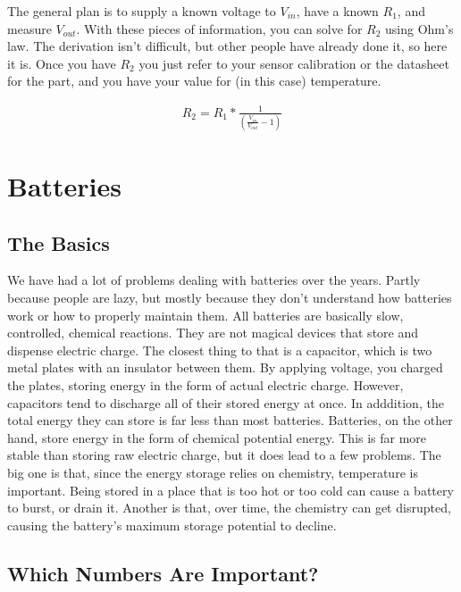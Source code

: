 The general plan is to supply a known voltage to $V_{in}$, have a known $R_1$, and measure $V_{out}$. With these pieces of information, you can solve for $R_2$ using Ohm's law. The derivation isn't difficult, but other people have already done it, so here it is. Once you have $R_2$ you just refer to your sensor calibration or the datasheet for the part, and you have your value for (in this case) temperature.

\begin{equation} \label{eqn:solveforr}
\begin{split}
R_2 = R_1*\frac{1}{(\frac{V_{in}}{V_{out}}-1)}
\end{split}
\end{equation}

\section{Batteries}
\label{sec:batteries}

\subsection{The Basics}

We have had a lot of problems dealing with batteries over the years. Partly because people are lazy, but mostly because they don't understand how batteries work or how to properly maintain them. All batteries are basically slow, controlled, chemical reactions. They are not magical devices that store and dispense electric charge. The closest thing to that is a capacitor, which is two metal plates with an insulator between them. By applying voltage, you charged the plates, storing energy in the form of actual electric charge. However, capacitors tend to discharge all of their stored energy at once. In adddition, the total energy they can store is far less than most batteries. Batteries, on the other hand, store energy in the form of chemical potential energy. This is far more stable than storing raw electric charge, but it does lead to a few problems. The big one is that, since the energy storage relies on chemistry, temperature is important. Being stored in a place that is too hot or too cold can cause a battery to burst, or drain it. Another is that, over time, the chemistry can get disrupted, causing the battery's maximum storage potential to decline.

\subsection{Which Numbers Are Important?}

